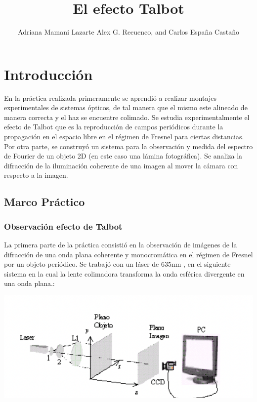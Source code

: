 \documentclass{./packages/optica-article}
\begin{document}
\title{El efecto Talbot}

\author{Adriana Mamani Lazarte Alex G. Recuenco, and Carlos España Castaño}

\address{Universidad Complutense de Madrid, Madrid, PC 28040, España}

\section{Introducción}
En la práctica realizada primeramente se aprendió a realizar montajes experimentales de sistemas ópticos, de tal manera que el mismo este alineado de manera correcta y el haz se encuentre colimado. Se estudia experimentalmente el efecto de Talbot que es la reproducción de campos periódicos durante la propagación en el espacio
libre en el régimen de Fresnel para ciertas distancias. Por otra parte, se construyó un sistema para la observación y medida del espectro de Fourier de un objeto 2D (en este caso una lámina fotográfica). Se analiza la difracción de la iluminación coherente de una imagen al mover la cámara con respecto a la imagen.


\subsection{Marco Práctico}
\subsubsection{Observación efecto de Talbot}

	      La primera parte de la práctica consistió en la observación de imágenes de la difracción de una onda plana coherente y monocromática en el régimen de Fresnel por un objeto periódico.
	      Se trabajó con un láser de 635nm , en el siguiente sistema en la cual la lente colimadora transforma la onda esférica divergente en una onda plana.:

	      \begin{center}
		      \includegraphics[scale=1]{sistematalbot.png}
		      \label{fig:talbot} %
	      \end{center}
\end{document}
